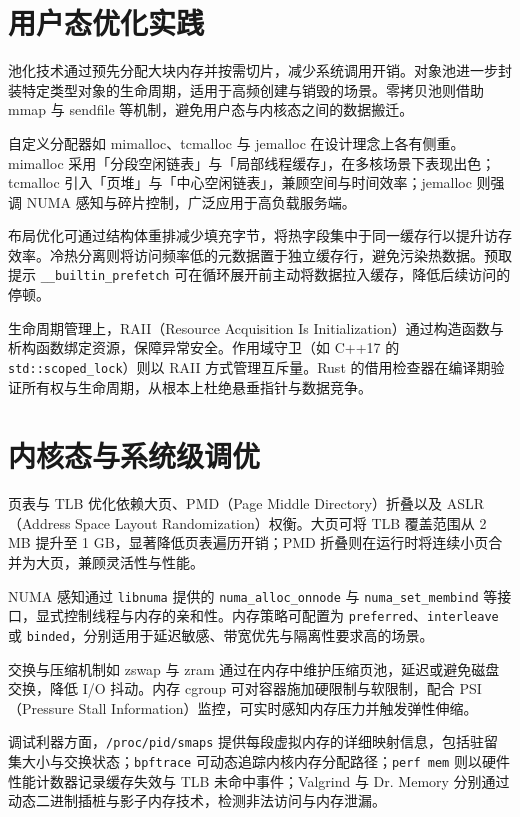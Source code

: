 \chapter{用户态优化实践}
池化技术通过预先分配大块内存并按需切片，减少系统调用开销。对象池进一步封装特定类型对象的生命周期，适用于高频创建与销毁的场景。零拷贝池则借助 mmap 与 sendfile 等机制，避免用户态与内核态之间的数据搬迁。\par
自定义分配器如 mimalloc、tcmalloc 与 jemalloc 在设计理念上各有侧重。mimalloc 采用「分段空闲链表」与「局部线程缓存」，在多核场景下表现出色；tcmalloc 引入「页堆」与「中心空闲链表」，兼顾空间与时间效率；jemalloc 则强调 NUMA 感知与碎片控制，广泛应用于高负载服务端。\par
布局优化可通过结构体重排减少填充字节，将热字段集中于同一缓存行以提升访存效率。冷热分离则将访问频率低的元数据置于独立缓存行，避免污染热数据。预取提示 \texttt{\_{}\_{}builtin\_{}prefetch} 可在循环展开前主动将数据拉入缓存，降低后续访问的停顿。\par
生命周期管理上，RAII（Resource Acquisition Is Initialization）通过构造函数与析构函数绑定资源，保障异常安全。作用域守卫（如 C++17 的 \texttt{std::scoped\_{}lock}）则以 RAII 方式管理互斥量。Rust 的借用检查器在编译期验证所有权与生命周期，从根本上杜绝悬垂指针与数据竞争。\par
\chapter{内核态与系统级调优}
页表与 TLB 优化依赖大页、PMD（Page Middle Directory）折叠以及 ASLR（Address Space Layout Randomization）权衡。大页可将 TLB 覆盖范围从 2 MB 提升至 1 GB，显著降低页表遍历开销；PMD 折叠则在运行时将连续小页合并为大页，兼顾灵活性与性能。\par
NUMA 感知通过 \texttt{libnuma} 提供的 \texttt{numa\_{}alloc\_{}onnode} 与 \texttt{numa\_{}set\_{}membind} 等接口，显式控制线程与内存的亲和性。内存策略可配置为 \texttt{preferred}、\texttt{interleave} 或 \texttt{binded}，分别适用于延迟敏感、带宽优先与隔离性要求高的场景。\par
交换与压缩机制如 zswap 与 zram 通过在内存中维护压缩页池，延迟或避免磁盘交换，降低 I/O 抖动。内存 cgroup 可对容器施加硬限制与软限制，配合 PSI（Pressure Stall Information）监控，可实时感知内存压力并触发弹性伸缩。\par
调试利器方面，\texttt{/proc/pid/smaps} 提供每段虚拟内存的详细映射信息，包括驻留集大小与交换状态；\texttt{bpftrace} 可动态追踪内核内存分配路径；\texttt{perf mem} 则以硬件性能计数器记录缓存失效与 TLB 未命中事件；Valgrind 与 Dr. Memory 分别通过动态二进制插桩与影子内存技术，检测非法访问与内存泄漏。\par
